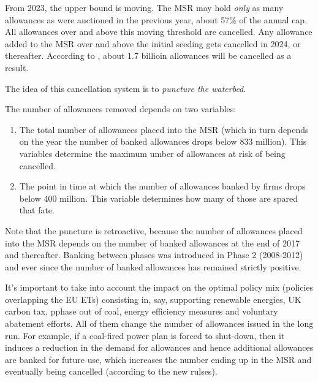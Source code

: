 From 2023, the upper bound is moving. The MSR may hold \emph{only} as many allowances as were auctioned in the previous year, about 57\% of the annual cap. All allowances over and above this moving threshold are cancelled. Any allowance added to the MSR over and above the initial seeding gets cancelled in 2024, or thereafter. According to \cite{perino2017eu}, about 1.7 billioin allowances will be cancelled as a result.

The idea of this cancellation system is to \emph{puncture the waterbed}.

The number of allowances removed depends on two variables:
\begin{enumerate}[wide, itemsep=0cm, topsep=0cm, labelindent=2cm]
	\item The total number of allowances placed into the MSR (which in turn depends on the year the number of banked allowances drops below 833 million). This variables determine the maximum umber of allowances at risk of being cancelled.
	\item The point in time at which the number of allowances banked by firms drops below 400 million. This variable determines how many of those are spared that fate.
\end{enumerate}

Note that the puncture is retroactive, because the number of allowances placed into the MSR depends on the number of banked allowances at the end of 2017 and thereafter. Banking between phases was introduced in Phase 2 (2008-2012) and ever since the number of banked allowances has remained strictly positive.

It's important to take into account the impact on the optimal policy mix (policies overlapping the EU ETs) consisting in, say, supporting renewable energies, UK carbon tax, pphase out of coal, energy efficiency measures and voluntary abatement efforts. All of them change the number of allowances issued in the long run. For example, if a coal-fired power plan is forced to shut-down, then it induces a reduction in the demand for allowances and hence additional allowances  are banked for future use, which increases the number ending up in the MSR and eventually being cancelled (according to the new rulses).

